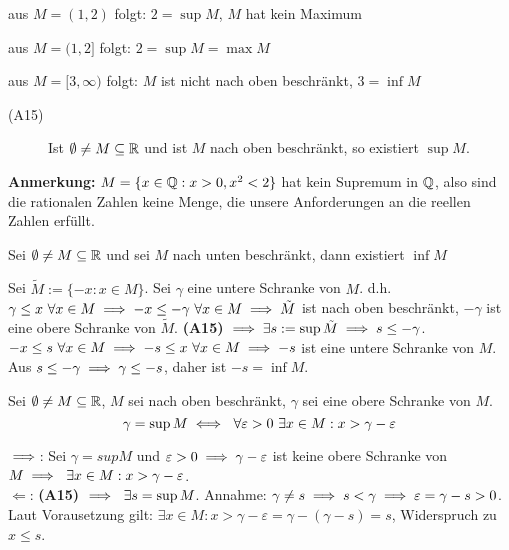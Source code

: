 \documentclass[a4paper,oneside,DIV15,BCOR12mm]{scrbook}
\begin{document}
\begin{beispiele}
\item aus $M = (1,2)$ folgt: $2 = \sup{M}$, $M$ hat kein Maximum
\item aus $M = (1,2]$ folgt: $2 = \sup{M} = \max{M}$
\item aus $M = [3,\infty)$ folgt: $M$ ist nicht nach oben beschränkt, $3 = \inf{M}$
\end{beispiele}

\begin{axiom}[Vollständigkeitsaxiom]
\begin{description}
\item[(A15)] Ist $\emptyset \ne M \subseteq \mathbb{R}$ und ist $M$ nach oben beschränkt, so existiert $\sup{M}$.
\end{description}
\end{axiom}

\textbf{Anmerkung:} $M = \{x\in\mathbb{Q}: x > 0, x^2 < 2\}$ hat kein Supremum in $\mathbb{Q}$, also sind die rationalen Zahlen keine Menge, die unsere Anforderungen an die reellen Zahlen erfüllt.

\begin{satz}
Sei $ \emptyset \ne M \subseteq \mathbb{R}$ und sei $M$ nach unten beschränkt, dann existiert $\inf{M}$
\end{satz}

\begin{beweis} Sei $\tilde M := \{ -x : x\in M\}$. Sei $\gamma$ eine untere Schranke von $M$. d.h. $\gamma \le x \ \forall x \in M \implies -x \le -\gamma \ \forall x \in M \implies \tilde M $ ist nach oben beschränkt, $-\gamma$ ist eine obere Schranke von $\tilde M$. \textbf{(A15)} $\implies \exists s := \sup{\tilde M} \implies s \le - \gamma$. $-x \le s \ \forall x \in M \folgt -s \le x \ \forall x \in M \folgt -s $ ist eine untere Schranke von $M$. Aus $s \le -\gamma \implies \gamma \le -s$, daher ist $-s = \inf{M}$.
\end{beweis}

\begin{satz}
Sei $\emptyset \ne M \subseteq \mathbb{R}$, $M$ sei nach oben beschränkt, $\gamma$ sei eine obere Schranke von $M$.
\[ \gamma = \sup{M} \equizu \ \forall\varepsilon > 0 \ \exists x \in M: x > \gamma - \varepsilon \]
\end{satz}

\begin{beweis} \glqq$\implies$\grqq: Sei $\gamma = sup{M}$ und $\varepsilon > 0 \implies \gamma - \varepsilon$ ist keine obere Schranke von $M \implies \ \exists x\in M: x > \gamma - \varepsilon$. \\
 \glqq$\Leftarrow$\grqq: \textbf{(A15)} $\implies \ \exists s = \sup{M}$. Annahme: $\gamma \ne s \implies s < \gamma \implies \varepsilon = \gamma - s > 0$. Laut Vorausetzung gilt: $\exists x \in M: x > \gamma - \varepsilon = \gamma - (\gamma - s) = s$, Widerspruch zu $x \le s$.
\end{beweis}
\end{document}
